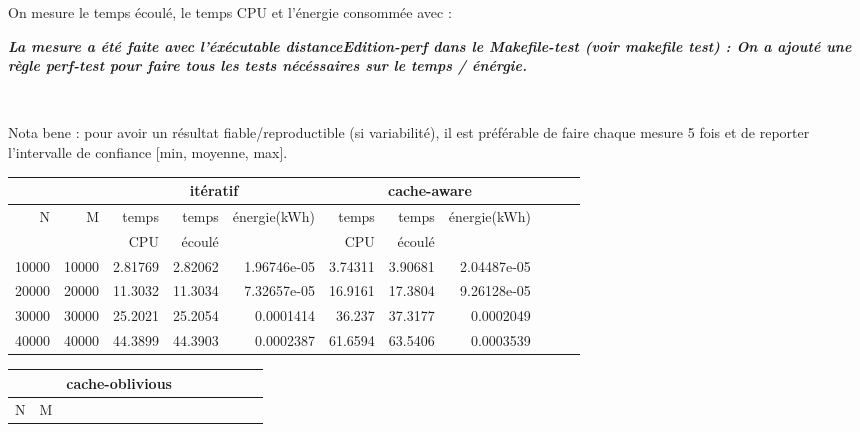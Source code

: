 \documentclass[10pt,a4paper]{article}
\begin{document}
{On mesure le temps écoulé, le temps CPU et l'énergie consommée avec : \\ {\em
\textbf{La mesure a été faite avec l'éxécutable distanceEdition-perf dans le Makefile-test (voir makefile test) : On a ajouté une règle perf-test pour faire tous les
tests nécéssaires sur le temps / énérgie. }

\\

 }

Nota bene : pour avoir un résultat fiable/reproductible (si variabilité), 
il est préférable de faire chaque mesure 5 fois et de reporter l'intervalle
de confiance [min, moyenne, max].

\begin{tabular}{|r|r||r|r|r||r|r|r||r|r|r||}
\hline
 \multicolumn{2}{|c||}{ } 
& \multicolumn{3}{c||}{itératif}
& \multicolumn{3}{c||}{cache-aware}

\\ \hline
N & M 
& temps   & temps & énergie(kWh)      %
& temps   & temps & énergie(kWh)      %

\\
& 
& CPU     & écoulé&               %
& CPU     & écoulé&               %

\\ \hline
\hline
10000 & 10000 
& 2.81769 & 2.82062  & 1.96746e-05  %
& 3.74311 & 3.90681 & 2.04487e-05  %

\\ \hline
20000 & 20000 
& 11.3032 & 11.3034 & 7.32657e-05  %
& 16.9161 & 17.3804 & 9.26128e-05  %

\\ \hline
30000 & 30000 
& 25.2021 & 25.2054 & 0.0001414 %
& 36.237 & 37.3177 & 0.0002049  %
\\ \hline
40000 & 40000 
& 44.3899  & 44.3903  & 0.0002387  %
& 61.6594 & 63.5406 & 0.0003539 %
\\ \hline
\hline
\end{tabular}

\begin{tabular}{|r|r||r|r|r||r|r|r||r|r|r||}
  \hline
   \multicolumn{2}{|c||}{ } 
   & \multicolumn{3}{c||}{cache-oblivious}
   \\ \hline
N & M 


\end{tabular}}
\end{document}
